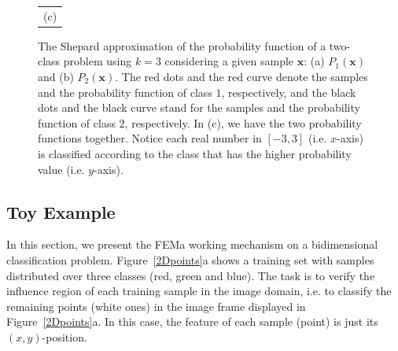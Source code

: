 \begin{figure}[!htb]
\begin{tabular}{c}
(c)
\end{tabular}
\caption{The Shepard approximation of the probability function of a two-class problem using $k=3$ considering a given sample $\textbf{x}$: (a) $P_1(\textbf{x})$ and (b) $P_2(\textbf{x})$. The red dots and the red curve denote the samples and the probability function of class $1$, respectively, and the black dots and the black curve stand for the samples and the probability function of class $2$, respectively. In (c), we have the two probability functions together. Notice each real number in $[-3,3]$ (i.e. $x$-axis) is classified according to the class that has the higher probability value (i.e. $y$-axis).}
\label{fig.ProbFunc}
\end{figure}

\subsection{Toy Example}
\label{ss.toy}

In this section, we present the FEMa working mechanism on a bidimensional classification problem. Figure~\ref{2Dpoints}a shows a training set with samples distributed over three classes (red, green and blue). The task is to verify the influence region of each training sample in the image domain, i.e. to classify the remaining points (white ones) in the image frame displayed in Figure~\ref{2Dpoints}a. In this case, the feature of each sample (point) is just its $(x,y)$-position.

